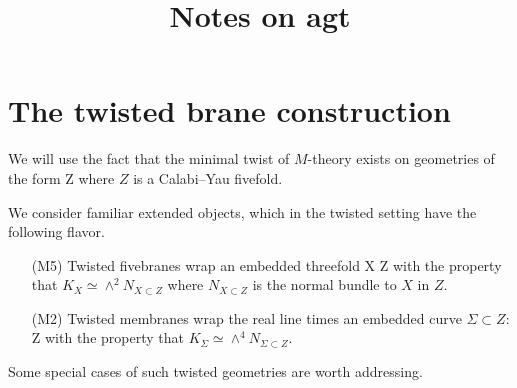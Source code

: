 \documentclass[11pt]{amsart}
\begin{document}
\title{Notes on agt}
\maketitle


\section{The twisted brane construction}

We will use the fact that the minimal twist of $M$-theory exists on geometries of the form
\beqn
Z \times \R
\eeqn
where $Z$ is a Calabi--Yau fivefold.

We consider familiar extended objects, which in the twisted setting have the following flavor.
\begin{itemize}
\item[(M5)] Twisted fivebranes wrap an embedded threefold
\beqn
X \subset Z
\eeqn
with the property that $K_X \simeq \wedge^2 N_{X \subset Z}$ where $N_{X \subset Z}$ is the normal bundle to $X$ in $Z$.
\item[(M2)] Twisted membranes wrap the real line times an embedded curve $\Sigma \subset Z$:
\beqn
\Sigma \times \R \subset Z \times \R
\eeqn
with the property that $K_\Sigma \simeq \wedge^4 N_{\Sigma \subset Z}$.
\end{itemize}



Some special cases of such twisted geometries are worth addressing.
\end{document}
